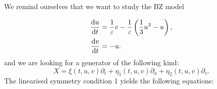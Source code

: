 We remind ourselves that we want to study the BZ model

\begin{equation}
  \begin{split}
    \dv{u}{t}&=\dfrac{1}{\varepsilon}v-\dfrac{1}{\varepsilon}\left(\dfrac{1}{3}u^3-u\right),\\
    \dv{v}{t}&=-u.\\    
    \end{split}
  \label{eq:BZ}
\end{equation}
and we are looking for a generator of the following kind:
\begin{equation}
X=\xi(t,u,v)\partial_t+\eta_1(t,u,v)\partial_u+\eta_2(t,u,v)\partial_v.
\end{equation}
The linearised symmetry condition 1 yields the following equations:


